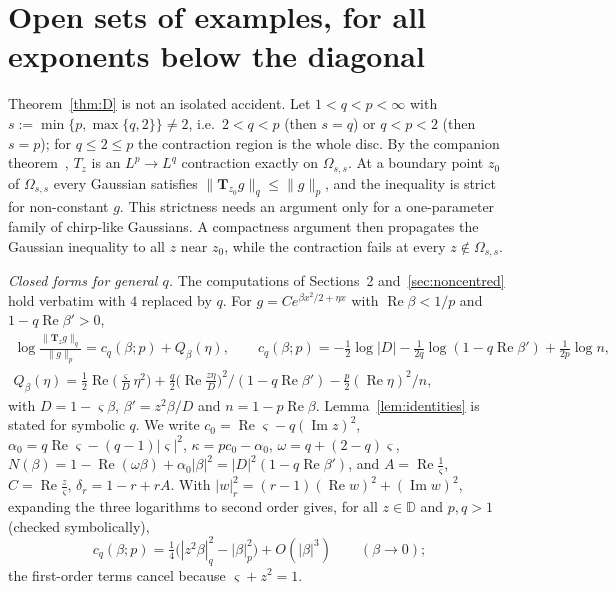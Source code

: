 \documentclass[11pt]{amsart}
\theoremstyle{definition}
\newcommand{\Rea}{\operatorname{Re}}
\newcommand{\Ima}{\operatorname{Im}}
\newcommand{\bT}{\mathbf{T}}
\newcommand{\D}{\mathbb{D}}
\begin{document}
\section{Open sets of examples, for all exponents below the diagonal}\label{sec:open}
Theorem~\ref{thm:D} is not an isolated accident. Let $1<q<p<\infty$ with $s:=\min\{p,\max\{q,2\}\}\ne2$, i.e.\
$2<q<p$ (then $s=q$) or $q<p<2$ (then $s=p$); for $q\le2\le p$ the contraction region is the whole disc. By the
companion theorem~\cite[Theorem~1.1]{DCH}, $T_z$ is an $L^p\to L^q$ contraction exactly on $\Omega_{s,s}$. At a
boundary point $z_0$ of $\Omega_{s,s}$ every Gaussian satisfies $\|\bT_{z_0}g\|_q\le\|g\|_p$, and the inequality is
strict for non-constant $g$. This strictness needs an argument only for a one-parameter family of chirp-like
Gaussians. A compactness argument then propagates the Gaussian inequality to all $z$ near $z_0$, while the
contraction fails at every $z\notin\Omega_{s,s}$.

\emph{Closed forms for general $q$.} The computations of Sections~2 and~\ref{sec:noncentred} hold verbatim with $4$
replaced by $q$. For $g=Ce^{\beta x^2/2+\eta x}$ with $\Rea\beta<1/p$ and $1-q\Rea\beta'>0$,
\begin{gather*}
\log\frac{\|\bT_zg\|_q}{\|g\|_p}=c_q(\beta;p)+Q_\beta(\eta),\qquad
c_q(\beta;p)=-\tfrac12\log|D|-\tfrac1{2q}\log(1-q\Rea\beta')+\tfrac1{2p}\log n,\\
Q_\beta(\eta)=\tfrac12\Rea\big(\tfrac\varsigma D\eta^2\big)+\tfrac q2\big(\Rea\tfrac{z\eta}D\big)^2\big/(1-q\Rea\beta')
-\tfrac p2(\Rea\eta)^2/n,
\end{gather*}
with $D=1-\varsigma\beta$, $\beta'=z^2\beta/D$ and $n=1-p\Rea\beta$. Lemma~\ref{lem:identities} is stated for symbolic
$q$. We write $c_0=\Rea\varsigma-q(\Ima z)^2$, $\alpha_0=q\Rea\varsigma-(q-1)|\varsigma|^2$, $\kappa=pc_0-\alpha_0$,
$\omega=q+(2-q)\varsigma$, $N(\beta)=1-\Rea(\omega\beta)+\alpha_0|\beta|^2=|D|^2(1-q\Rea\beta')$, and
$A=\Rea\frac1\varsigma$, $C=\Rea\frac z\varsigma$, $\delta_r=1-r+rA$. With $|w|_r^2=(r-1)(\Rea w)^2+(\Ima w)^2$,
expanding the three logarithms to second order gives, for all $z\in\D$ and $p,q>1$ (checked symbolically),
\begin{equation}\label{eq:c2}
c_q(\beta;p)=\tfrac14\big(|z^2\beta|_q^2-|\beta|_p^2\big)+O(|\beta|^3)\qquad(\beta\to0);
\end{equation}
the first-order terms cancel because $\varsigma+z^2=1$.
\end{document}

